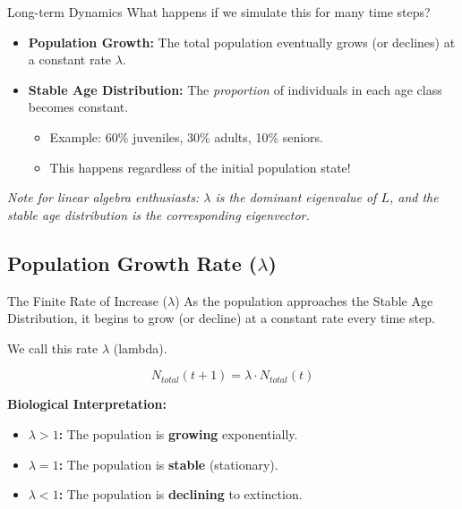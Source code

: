 \begin{frame}{Long-term Dynamics}
What happens if we simulate this for many time steps?
\vspace{1em}
\begin{itemize}
    \item \textbf{Population Growth:} The total population eventually grows (or declines) at a constant rate $\lambda$.
    \item \textbf{Stable Age Distribution:} The \textit{proportion} of individuals in each age class becomes constant.
    \begin{itemize}
        \item Example: 60\% juveniles, 30\% adults, 10\% seniors.
        \item This happens regardless of the initial population state!
    \end{itemize}
\end{itemize}
\vspace{1em}
\textit{Note for linear algebra enthusiasts: $\lambda$ is the dominant eigenvalue of $L$, and the stable age distribution is the corresponding eigenvector.}
\end{frame}


\subsection{Population Growth Rate ($\lambda$)}

\begin{frame}{The Finite Rate of Increase ($\lambda$)}
    \small
    As the population approaches the Stable Age Distribution, it begins to grow (or decline) at a constant rate every time step.
    
    \vspace{1em}
    We call this rate $\lambda$ (lambda).
    
    \begin{equation*}
        N_{total}(t+1) = \lambda \cdot N_{total}(t)
    \end{equation*}
    
    \vspace{1em}
    \textbf{Biological Interpretation:}
    \begin{itemize}
        \item \textbf{$\lambda > 1$:} The population is \textbf{growing} exponentially.
        \item \textbf{$\lambda = 1$:} The population is \textbf{stable} (stationary).
        \item \textbf{$\lambda < 1$:} The population is \textbf{declining} to extinction.
    \end{itemize}
\end{frame}

